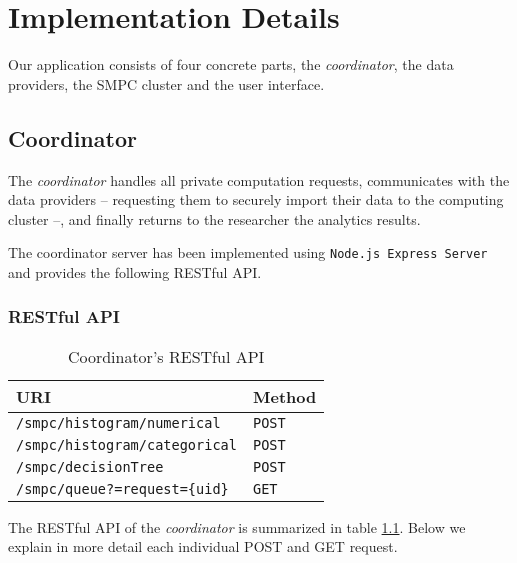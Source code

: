\chapter{Implementation Details}\label{c:implementation}

Our application consists of four concrete parts, the \textit{coordinator}, the data providers, the SMPC cluster and the user interface.

\section{Coordinator}\label{s:impl-coordinator}
The \textit{coordinator} handles all private computation requests, communicates with the data providers -- requesting them to securely import their data to the computing cluster --, and finally returns to the researcher the analytics results.

The coordinator server has been implemented using \texttt{Node.js Express Server} and provides the following RESTful API.


\subsection{RESTful API}\label{ss:coord-restful-api}

\begin{table}[H]
\centering
\caption{Coordinator's RESTful API}
\label{t:coordinator-api}
\begin{tabular}{@{}ll@{}}
\toprule
URI                                   & Method        \\ \midrule
\texttt{/smpc/histogram/numerical}    & \texttt{POST} \\
\texttt{/smpc/histogram/categorical}  & \texttt{POST} \\
\texttt{/smpc/decisionTree}           & \texttt{POST} \\
\texttt{/smpc/queue?=request=\{uid\}} & \texttt{GET}  \\ \bottomrule
\end{tabular}
\end{table}

The RESTful API of the \textit{coordinator} is summarized in table \ref{t:coordinator-api}.
Below we explain in more detail each individual POST and GET request.

